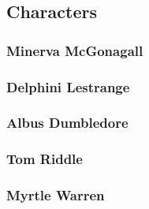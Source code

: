 \pagebreak

\subsection{Characters}

\subsubsection{Minerva McGonagall}



\subsubsection{Delphini Lestrange}



\subsubsection{Albus Dumbledore}



\subsubsection{Tom Riddle}



\subsubsection{Myrtle Warren}



\pagebreak
